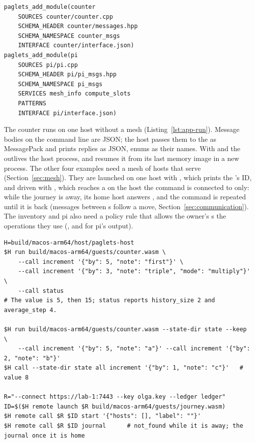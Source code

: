 \begin{lstlisting}[style=paglets-cmake,caption={The build of the counter and of pi \src{cpp/examples/CMakeLists.txt}},label={lst:app-cmake}]
paglets_add_module(counter
    SOURCES counter/counter.cpp
    SCHEMA_HEADER counter/messages.hpp
    SCHEMA_NAMESPACE counter_msgs
    INTERFACE counter/interface.json)
paglets_add_module(pi
    SOURCES pi/pi.cpp
    SCHEMA_HEADER pi/pi_msgs.hpp
    SCHEMA_NAMESPACE pi_msgs
    SERVICES mesh_info compute_slots
    PATTERNS
    INTERFACE pi/interface.json)
\end{lstlisting}

The counter runs on one host without a mesh (Listing~\ref{lst:app-run}).
Message bodies on the command line are JSON; the host passes them to the
\paglet{} as MessagePack and prints replies as JSON, enums as their names.
With  and  the \paglet{} outlives the
host process, and  resumes it from its last memory image in a
new process. The other four examples need a mesh of hosts that serve
(Section~\ref{sec:mesh}). They are launched on one host with
, which prints the \paglet{}'s ID, and driven with
, which reaches a \paglet{} on the host the command is
connected to only: while the journey is away, its home host answers
, and the command is repeated until it is back
(messages between \paglet{}s follow a move,
Section~\ref{sec:communication}). The inventory and pi also need a
policy rule that allows the owner's \paglet{}s the operations they use
(, and  for pi's output).

\begin{lstlisting}[style=paglets-bash,caption={Running the counter locally, and the journey on a mesh},label={lst:app-run}]
H=build/macos-arm64/host/paglets-host
$H run build/macos-arm64/guests/counter.wasm \
    --call increment '{"by": 5, "note": "first"}' \
    --call increment '{"by": 3, "note": "triple", "mode": "multiply"}' \
    --call status
# The value is 5, then 15; status reports history_size 2 and average_step 4.

$H run build/macos-arm64/guests/counter.wasm --state-dir state --keep \
    --call increment '{"by": 5, "note": "a"}' --call increment '{"by": 2, "note": "b"}'
$H call --state-dir state all increment '{"by": 1, "note": "c"}'   # value 8

R="--connect https://lab-1:7443 --key olga.key --ledger ledger"
ID=$($H remote launch $R build/macos-arm64/guests/journey.wasm)
$H remote call $R $ID start '{"hosts": [], "label": ""}'
$H remote call $R $ID journal      # not_found while it is away; the journal once it is home
\end{lstlisting}

